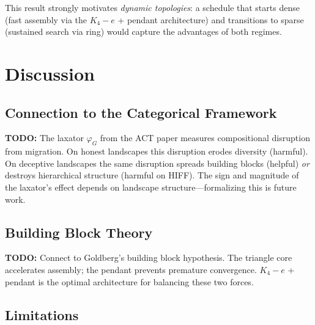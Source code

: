 \documentclass[sigconf,nonacm]{acmart}
\begin{document}
This result strongly motivates \emph{dynamic topologies}: a schedule
that starts dense (fast assembly via the $K_4{-}e$ + pendant
architecture) and transitions to sparse (sustained search via ring)
would capture the advantages of both regimes.


\section{Discussion}
\label{sec:discussion}

\subsection{Connection to the Categorical Framework}


\textbf{TODO:} The laxator $\varphi_G$ from the ACT paper measures
compositional disruption from migration. On honest landscapes this
disruption erodes diversity (harmful). On deceptive landscapes the
same disruption spreads building blocks (helpful) \emph{or} destroys
hierarchical structure (harmful on HIFF). The sign and magnitude of
the laxator's effect depends on landscape structure---formalizing this
is future work.

\subsection{Building Block Theory}


\textbf{TODO:} Connect to Goldberg's building block hypothesis.
The triangle core accelerates assembly; the pendant prevents
premature convergence. $K_4 - e$ + pendant is the optimal architecture
for balancing these two forces.

\subsection{Limitations}
\end{document}
